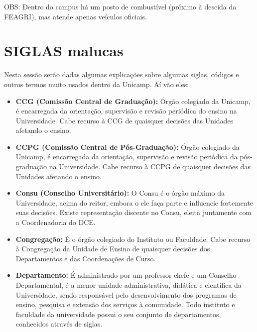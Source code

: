 OBS: Dentro do campus há um posto de combustível (próximo à descida da FEAGRI),
mas atende apenas veículos oficiais.

\section{SIGLAS malucas}

Nesta sessão serão dadas algumas explicações sobre algumas siglas, códigos
e outros termos muito usados dentro da Unicamp. Aí vão eles:

\begin{itemize}
\item  \textbf{CCG (Comissão Central de Graduação):} Órgão colegiado da Unicamp, é encarregada da orientação, supervisão e revisão periódica do ensino na Universidade. Cabe recurso à CCG de quaisquer decisões das Unidades afetando o ensino.
\end{itemize}

\begin{itemize}
\item  \textbf{CCPG (Comissão Central de Pós-Graduação):} Órgão colegiado da Unicamp, é encarregada da orientação, supervisão e revisão periódica da pós-graduação na Universidade. Cabe recurso à CCPG de quaisquer decisões das Unidades afetando o ensino.
\end{itemize}

\begin{itemize}
\item  \textbf{Consu (Conselho Universitário):} O Consu é o órgão máximo da
Universidade, acima do reitor, embora o ele faça parte e influencie fortemente suas decisões.
Existe representação discente no Consu, eleita juntamente com a Coordenadoria do DCE.
\end{itemize}

\begin{itemize}
\item  \textbf{Congregação:} É o órgão colegiado do Instituto ou Faculdade. Cabe recurso à Congregação da Unidade de Ensino de quaisquer decisões dos Departamentos e das Coordenações de Curso.
\end{itemize}

\begin{itemize}
\item  \textbf{Departamento:} É administrado por um professor-chefe e um Conselho Departamental, é a menor unidade administrativa, didática e científica da Universidade, sendo responsável pelo desenvolvimento dos programas de ensino, pesquisa e extensão dos serviços à comunidade. Todo instituto e faculdade da universidade possui o seu conjunto de departamentos, conhecidos através de siglas.
\end{itemize}


